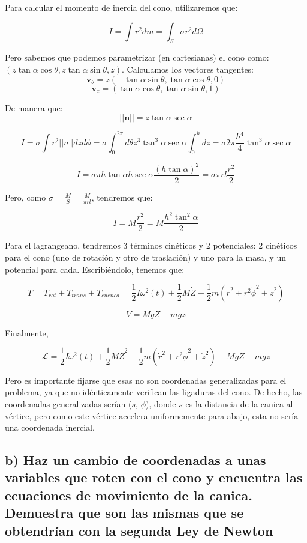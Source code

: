 \documentclass[a4paper,12pt]{article}
\begin{document}
Para calcular el momento de inercia del cono, utilizaremos que:

$$I = \int r^2 dm = \int_S \sigma r^2  d\Omega$$

Pero sabemos que podemos parametrizar (en cartesianas) el cono como: $(z \tan\alpha \cos\theta, z \tan\alpha \sin\theta, z)$. Calculamos los vectores tangentes:
$$\boldsymbol{v}_\theta = z (-\tan\alpha \sin\theta,\tan\alpha \cos\theta , 0)$$
$$\boldsymbol{v}_z = (\tan\alpha\cos\theta,\tan\alpha\sin\theta,1)$$

De manera que:
$$||\boldsymbol{n}|| = z\tan\alpha\sec{\alpha}$$

$$I= \sigma \int r^2 ||n||dzd\phi = \sigma\int_0^{2\pi}d\theta z^3 \tan^3\alpha \sec\alpha \int_0^h    dz = \sigma 2\pi \frac{h^4}{4} \tan^3\alpha \sec\alpha$$

$$I = \sigma \pi h\tan\alpha h\sec{\alpha} \frac{(h\tan\alpha)^2}{2} = \sigma \pi r l \frac{r^2}{2}  $$

Pero, como $\sigma = \frac{M}{S} = \frac{M}{\pi r l}$, tendremos que:

\begin{equation}
  I = M \frac{r^2}{2} = M \frac{h^2 \tan^2{\alpha}}{2} 
\end{equation}


Para el lagrangeano, tendremos 3 términos cinéticos y 2 potenciales: 2 cinéticos para el cono (uno de rotación y otro de traslación) y uno para la masa, y un potencial para cada. Escribiéndolo, tenemos que:

$$T = T_{rot} + T_{trans} + T_{cuenca} = \frac{1}{2} I \omega^2(t) + \frac{1}{2} M \dot{Z} + \frac{1}{2} m  (\dot{r}^2 + r^2 \dot{\phi}^2+\dot{z}^2)$$

$$V = M g Z + mgz$$

Finalmente, 

\begin{equation}
  \label{lagras}
  \mathcal{L} = \frac{1}{2} I \omega^2(t) + \frac{1}{2} M \dot{Z}^2 + \frac{1}{2} m  (\dot{r}^2 + r^2 \dot{\phi}^2+\dot{z}^2) - M g Z - mgz
\end{equation}

Pero es importante fijarse que esas no son coordenadas generalizadas para el problema, ya que no idénticamente verifican las ligaduras del cono. De hecho, las coordenadas generalizadas serían ($s$, $\phi$), donde $s$ es la distancia de la canica al vértice, pero como este vértice accelera uniformemente para abajo, esta no sería una coordenada inercial.

\subsection*{b) Haz un cambio de coordenadas a unas variables que roten con el cono y encuentra las ecuaciones de movimiento de la canica. Demuestra que son las mismas que se obtendrían con la segunda Ley de Newton} 
\end{document}
